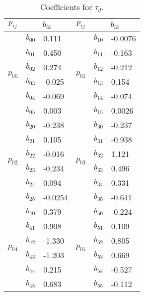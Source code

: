 \begin{table}
	\centering
	\caption{Coefficients for $\tau_d$.}
	\label{T:td}
	\begin{tabular}{@{}cll|cll@{}}
		\hline
		$p_{ij}$                  & \multicolumn{2}{c}{$b_{ik}$} & $p_{ij}$ & \multicolumn{2}{c}{$b_{ik}$}\\
		\hline
		\multirow{6}{*}{$p_{00}$} & $b_{00}$  & 0.111
		&   \multirow{6}{*}{$p_{01}$} & $b_{10}$ & -0.0076
		\\ %
		& $b_{01}$      & 0.450   &  	& $b_{11}$      & -0.163 \\ %
		& $b_{02}$      & 0.274   &	& $b_{12}$      & -0.212 \\ %
		& $b_{03}$      & -0.025   &	& $b_{13}$      & 0.154 \\ %
		& $b_{04}$      & -0.069  & 	& $b_{14}$      & -0.074  \\ %
		& $b_{05}$      & 0.003   &	& $b_{15}$      & 0.0026    \\ \hline
		\multirow{6}{*}{$p_{02}$} & $b_{20}$  & -0.238	& \multirow{6}{*}{$p_{03}$} & $b_{30}$ & -0.237 \\ %
		& $b_{21}$      & 0.105   & & $b_{31}$      & -0.938  \\ %
		& $b_{22}$      & -0.016   & & $b_{32}$      & 1.121  \\ %
		& $b_{23}$      & -0.234    & & $b_{33}$      & 0.496   \\ %
		& $b_{24}$      & 0.094  & & $b_{34}$      & 0.331  \\ %
		& $b_{25}$      & -0.0254   & & $b_{35}$      & -0.641  \\ \hline
		\multirow{6}{*}{$p_{04}$} & $b_{40}$      & 0.379  & \multirow{6}{*}{$p_{05}$} & $b_{50}$      & -0.224   \\ %
		& $b_{41}$      & 0.908     &  & $b_{51}$      & 0.109\\ %
		& $b_{42}$      & -1.330     &  & $b_{52}$      & 0.805\\ %
		& $b_{43}$      & -1.203    &  & $b_{53}$      & 0.669\\ %
		& $b_{44}$      & 0.215     &  & $b_{54}$      & -0.527\\ %
		& $b_{45}$      & 0.683   &  & $b_{55}$      & -0.112\\
		\hline
	\end{tabular}
\end{table}

